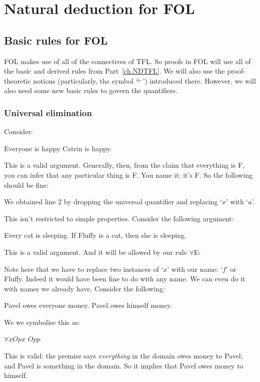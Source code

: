 \part{Natural deduction for FOL}
\label{ch.NDFOL}


\chapter{Basic rules for FOL}\label{s:BasicFOL}

FOL makes use of all of the connectives of TFL. So proofs in FOL will use all of the basic and derived rules from Part~\ref{ch.NDTFL}. We will also use the proof-theoretic notions (particularly, the symbol `$\vdash$') introduced there. However, we will also need some new basic rules to govern the quantifiers.


\section{Universal elimination}Consider:
\begin{earg}
\prem Everyone is happy
\conc Catrin is happy.
\end{earg} This is a valid argument. Generally, then, from the claim that everything is F, you can infer that any particular thing is F. You name it; it's F. So the following should be fine:
\begin{pf}
	 
\end{pf}
We obtained line 2 by dropping the universal quantifier and replacing `$x$' with `$a$'.

This isn't restricted to simple properties. Consider the following argument:
\begin{earg}
\prem Every cat is sleeping.
\conc If Fluffy is a cat, then she is sleeping.
\end{earg}
This is a valid argument. And it will be allowed by our rule $\forall$E:
\begin{pf}
	 
\end{pf}
Note here that we have to replace two instances of `$x$' with our name: `$f$' or Fluffy. Indeed it would have been fine to do with any name. We can even do it with names we already have. Consider the following:
\begin{earg}
\prem Pavel owes everyone money.
\conc Pavel owes himself money.
\end{earg}
We we symbolise this as:
\begin{earg}
\prem $\forall x Opx$
\conc $Opp$
\end{earg}
This is valid: the premise says \emph{everything} in the domain owes money to Pavel; and Pavel is something in the domain. So it implies that Pavel owes money to himself.

